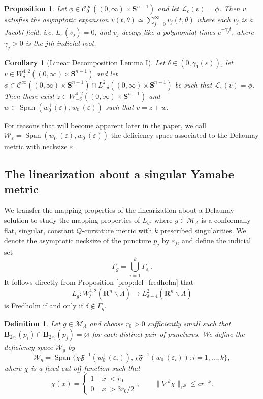 \documentclass[reqno,11pt]{amsart}
\newtheorem{corollary}[theorem]{Corollary}
\newtheorem{proposition}[theorem]{Proposition}
\newtheorem{definition}[theorem]{Definition}
\theoremstyle{tttheorem}
\newcommand{\Ss}{\mathbf{S}}
\newcommand{\R}{\mathbf{R}}
\begin{document}
\begin{proposition} \label{prop:jac_asymp_expansion} 
Let $\phi\in\mathcal{C}^\infty_0 ((0,\infty) \times \Ss^{n-1})$
and let $\mathcal{L}_\varepsilon(v) = \phi$. Then $v$ satisfies the asymptotic 
expansion $v(t,\theta) \simeq \sum_{j=0}^\infty v_j(t,\theta)$ where each 
$v_j$ is a Jacobi field, {\it i.e.} $L_\varepsilon (v_j) = 0$, and 
$v_j$ decays like a polynomial times $e^{-\gamma_j t}$, where $\gamma_j >0$ 
is the $j$th indicial root. 
\end{proposition} 

\begin{corollary} [Linear Decomposition Lemma I]
Let $\delta \in (0,\gamma_1(\varepsilon))$, let $v \in W^{4,2}_\delta ((0, \infty) \times 
\Ss^{n-1})$ and let $\phi \in \mathcal{C}^\infty((0,\infty) \times 
\Ss^{n-1}) \cap L^2_{-\delta} ((0,\infty) \times \Ss^{n-1})$ be such that 
$\mathcal{L}_\varepsilon (v) = \phi$. Then there exist $z \in W^{4,2}_{-\delta} 
((0, \infty) \times \Ss^{n-1})$ and $w \in \operatorname{Span} (w_0^+(\varepsilon), 
w_0^-(\varepsilon))$  such that $v = z + w$. 
\end{corollary} 
For reasons that will become apparent later in the paper, we 
call $\mathcal{W}_\varepsilon = \operatorname{Span} (w_0^+(\varepsilon), 
w_0^-(\varepsilon))$ the deficiency space associated to the 
Delaunay metric with necksize $\varepsilon$. 

\subsection{The linearization about a singular Yamabe metric}

We transfer the mapping properties of the linearization about a 
Delaunay solution to study the mapping properties of $L_g$, where 
$g \in \mathcal{M}_\Lambda$ is a conformally flat, singular, 
constant $Q$-curvature metric with $k$ prescribed singularities. 
We denote the asymptotic necksize of the puncture $p_j$ by 
$\varepsilon_j$, and define the indicial set 
$$\Gamma_g = \bigcup_{i=1}^k \Gamma_{\varepsilon_i}.$$
It follows directly from Proposition \ref{prop:del_fredholm}
that 
$$L_g : W^{4,2}_\delta (\R^n \backslash \widetilde 
\Lambda) \rightarrow L^2_{\delta-4} (\R^n \backslash 
\widetilde \Lambda)$$
is Fredholm if and only if $\delta \not \in \Gamma_g$. 

\begin{definition} \label{deficiency_defn}
Let $g\in \mathcal{M}_\Lambda$ and choose $r_0>0$ sufficiently 
small such that $\mathbf{B}_{2r_0} (p_i) \cap \mathbf{B}_{2r_0}(p_j) 
= \varnothing$ for each distinct pair of punctures. We define the 
deficiency space $\mathcal{W}_g$ by 
$$\mathcal{W}_g = \operatorname{Span} \{ \chi \mathfrak{F}^{-1} (w_0^+(\varepsilon_i)), 
\chi \mathfrak{F}^{-1} (w_0^-(\varepsilon_i)): i=1, \dots, k\},$$
where $\chi$ is a fixed cut-off function such that 
$$\chi(x) = \left \{ \begin{array}{rl} 1 & |x| < r_0 \\ 0 & |x|> 3r_0/2 
\end{array} \right . , \qquad \|\nabla^k \chi \|_{\mathcal{C}^0} 
\leq c r^{-k}. $$
\end{definition}
\end{document}
